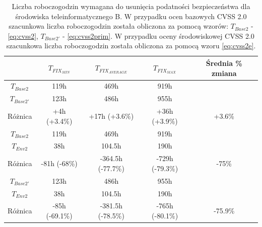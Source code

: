 \begin{table}[tbh]
\caption{Liczba roboczogodzin wymagana do usunięcia podatności bezpieczeństwa dla środowiska teleinformatycznego B. W przypadku ocen bazowych CVSS 2.0 szacunkowa liczba roboczogodzin została obliczona za pomocą wzorów: $T_{Base2}$ - \ref{eq:cvss2}, $T_{Base2'}$ - \ref{eq:cvss2prim}. W przypadku oceny środowiskowej CVSS 2.0 szacunkowa liczba roboczogodzin została obliczona za pomocą wzoru \ref{eq:cvss2e}.}
\begin{center}
\label{tab:chapter6:env_b:time_results_cvss2}
\begin{tabular}{c|ccc|c}
\hline
                 & \textbf{$T_{FIX_{MIN}}$} & \textbf{$T_{FIX_{AVERAGE}}$} & \textbf{$T_{FIX_{MAX}}$ }  & Średnia \% zmiana \\
\hline
$T_{Base2}$      &                        119h &              469h &    919h         &        \\
$T_{Base2'}$     &                        123h &              486h &    955h         &         \\
Różnica          &                +4h (+3.4\%) &       +17h (+3.6\%) & +36h (+3.9\%) & +3.6\%   \\  
\hline
$T_{Base2}$      &                       119h &              469h &    919h         &         \\
$T_{Env2}$       &                        38h &            104.5h &    190h         &         \\
Różnica          &             -81h (-68\%) & -364.5h (-77.7\%) & -729h (-79.3\%) & -75\% \\  
\hline
$T_{Base2'}$     &                       123h &              486h &     955h        &         \\
$T_{Env2}$        &                       38h &            104.5h &     190h        &         \\
Różnica          &             -85h (-69.1\%) & -381.5h (-78.5\%) & -765h (-80.1\%) & -75.9\% \\  
\hline
\end{tabular}
\end{center}
\end{table}

